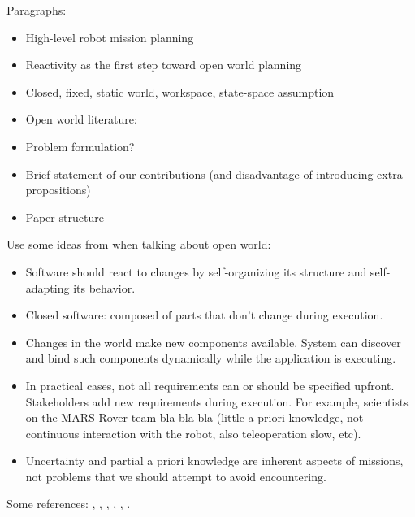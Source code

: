 Paragraphs:
\begin{itemize}
	\item High-level robot mission planning
	\item Reactivity as the first step toward open world planning
  	\item Closed, fixed, static world, workspace, state-space assumption
 	\item Open world literature: \cite{MatthiasAI2010}
	\item Problem formulation?
   	\item Brief statement of our contributions (and disadvantage of introducing extra propositions)
   	\item Paper structure
\end{itemize}

Use some ideas from \cite{open-world-sw} when talking about open world:
\begin{itemize}
	\item Software should react to changes by self-organizing its structure and self-adapting its behavior.
	\item Closed software: composed of parts that don't change during execution.
	\item Changes in the world make new components available. System can discover and bind such components dynamically while the application is executing.
	\item In practical cases, not all requirements can or should be specified upfront. Stakeholders add new requirements during execution. For example, scientists on the MARS Rover team bla bla bla (little a priori knowledge, not continuous interaction with the robot, also teleoperation slow, etc).
	\item Uncertainty and partial a priori knowledge are inherent aspects of missions, not problems that we should attempt to avoid encountering.
\end{itemize}

Some references: \cite{MurrayICRA2012}, \cite{MurrayICRA2013a},  \cite{BeltaICRA2012}, \cite{Dimos2013ICRA}, \cite{Belta2013RSS}, \cite{BingxinRSS2012}.
